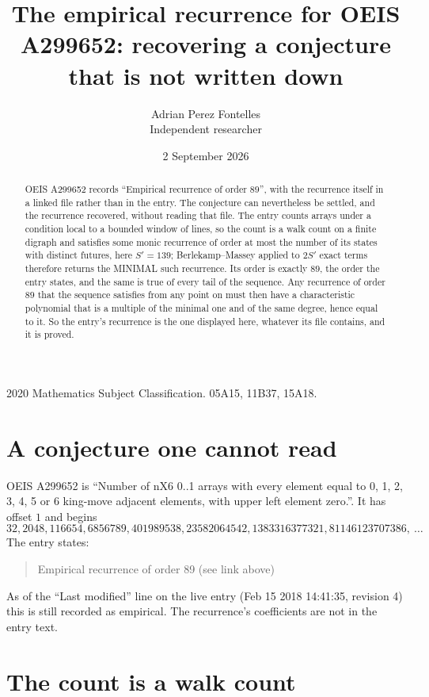 \documentclass[11pt,a4paper]{article}
\title{The empirical recurrence for OEIS A299652: recovering a conjecture that is not written down}
\author{Adrian Perez Fontelles\\ \small Independent researcher}
\date{2 September 2026}
\theoremstyle{plain}
\theoremstyle{definition}
\begin{document}
\maketitle

\begin{abstract}
OEIS A299652 records ``Empirical recurrence of order $89$'', with the recurrence itself in a
linked file rather than in the entry. The conjecture can nevertheless be settled, and the
recurrence recovered, without reading that file. The entry counts arrays under a condition
local to a bounded window of lines, so the count is a walk count on a finite digraph and
satisfies some monic recurrence of order at most the number of its states with distinct
futures, here $S'=139$; Berlekamp--Massey applied to $2S'$ exact
terms therefore returns the MINIMAL such recurrence. Its order is exactly $89$, the order
the entry states, and the same is true of every tail of the sequence. Any recurrence of order
$89$ that the sequence satisfies from any point on must then have a characteristic
polynomial that is a multiple of the minimal one and of the same degree, hence equal to it. So
the entry's recurrence is the one displayed here, whatever its file contains, and it is
proved.
\end{abstract}

\noindent\small 2020 Mathematics Subject Classification. 05A15, 11B37, 15A18.\normalsize

\section{A conjecture one cannot read}

OEIS A299652 is ``Number of nX6 0..1 arrays with every element equal to 0, 1, 2, 3, 4, 5 or 6 king-move adjacent elements, with upper left element zero.''. It has offset $1$ and begins
\[
32, 2048, 116654, 6856789, 401989538, 23582064542, 1383316377321, 81146123707386,\ \dots
\]
The entry states:
\begin{quote}
Empirical recurrence of order 89 (see link above)
\end{quote}
As of the ``Last modified'' line on the live entry (Feb 15 2018 14:41:35, revision 4) this is still
recorded as empirical. The recurrence's coefficients are not in the entry text.

\section{The count is a walk count}
\end{document}
